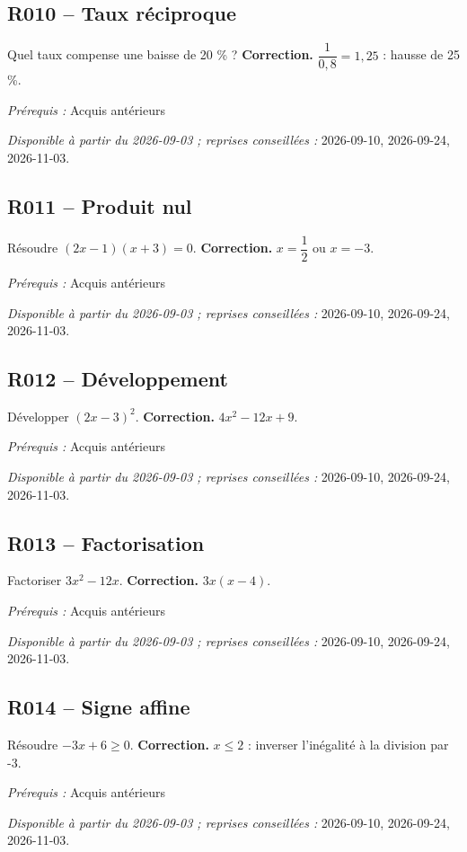 \subsection*{R010 -- Taux réciproque}\label{R010}
Quel taux compense une baisse de 20 \% ?
\ifprof\textbf{Correction.} $\dfrac{1}{0{,}8}=1{,}25$ : hausse de 25 \%.\par\textit{Prérequis :} Acquis antérieurs\par\textit{Disponible à partir du 2026-09-03 ; reprises conseillées :} 2026-09-10, 2026-09-24, 2026-11-03.\fi
{}\subsection*{R011 -- Produit nul}\label{R011}
Résoudre $(2x-1)(x+3)=0$.
\ifprof\textbf{Correction.} $x=\dfrac{1}{2}$ ou $x=-3$.\par\textit{Prérequis :} Acquis antérieurs\par\textit{Disponible à partir du 2026-09-03 ; reprises conseillées :} 2026-09-10, 2026-09-24, 2026-11-03.\fi
{}\subsection*{R012 -- Développement}\label{R012}
Développer $(2x-3)^2$.
\ifprof\textbf{Correction.} $4x^2-12x+9$.\par\textit{Prérequis :} Acquis antérieurs\par\textit{Disponible à partir du 2026-09-03 ; reprises conseillées :} 2026-09-10, 2026-09-24, 2026-11-03.\fi
{}\subsection*{R013 -- Factorisation}\label{R013}
Factoriser $3x^2-12x$.
\ifprof\textbf{Correction.} $3x(x-4)$.\par\textit{Prérequis :} Acquis antérieurs\par\textit{Disponible à partir du 2026-09-03 ; reprises conseillées :} 2026-09-10, 2026-09-24, 2026-11-03.\fi
{}\subsection*{R014 -- Signe affine}\label{R014}
Résoudre $-3x+6\geq0$.
\ifprof\textbf{Correction.} $x\leq2$ : inverser l’inégalité à la division par -3.\par\textit{Prérequis :} Acquis antérieurs\par\textit{Disponible à partir du 2026-09-03 ; reprises conseillées :} 2026-09-10, 2026-09-24, 2026-11-03.\fi
